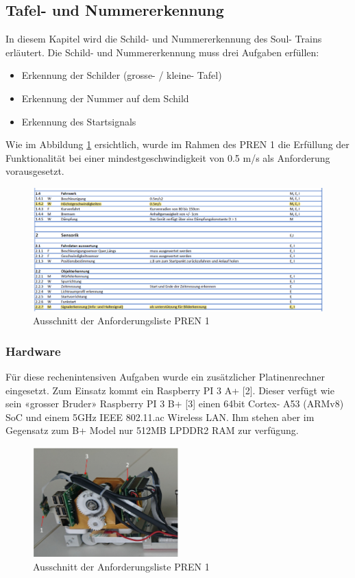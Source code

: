 \documentclass[../../main.tex]{subfiles}
\begin{document}
\subsection{Tafel- und Nummererkennung} \label{numberdetection}
In diesem Kapitel wird die Schild- und Nummererkennung des Soul- Trains erläutert. Die Schild- und Nummererkennung muss drei Aufgaben erfüllen:
\begin{itemize}
  \item Erkennung der Schilder (grosse- / kleine- Tafel)
  \item Erkennung der Nummer auf dem Schild
  \item Erkennung des Startsignals
\end{itemize}

Wie im Abbildung \ref{fig:ausschnitt_Anforderungsliste} ersichtlich, wurde im Rahmen des PREN 1 die Erfüllung der Funktionalität bei einer mindestgeschwindigkeit von 0.5 m/s als Anforderung vorausgesetzt. 

\begin{figure}[H] %
  \centering
  \includegraphics[width=1\textwidth]{Anforderung.png}
  \caption{Ausschnitt der Anforderungsliste PREN 1}
  \label{fig:ausschnitt_Anforderungsliste}
\end{figure}


\subsubsection{Hardware}
Für diese rechenintensiven Aufgaben wurde ein zusätzlicher Platinenrechner eingesetzt. Zum Einsatz kommt ein Raspberry PI 3 A+ [2]. Dieser verfügt wie sein «grosser Bruder» Raspberry PI 3 B+ [3] einen 64bit Cortex- A53 (ARMv8) SoC und einem 5GHz IEEE 802.11.ac Wireless LAN. Ihm stehen aber im Gegensatz zum B+ Model nur 512MB LPDDR2 RAM zur verfügung.   

\begin{figure}[H] %
  \centering
  \includegraphics[width=0.5\textwidth]{RPI-uebersicht.png}
  \caption{Ausschnitt der Anforderungsliste PREN 1}
  \label{fig:rpi-uebersicht}
\end{figure}
\end{document}
